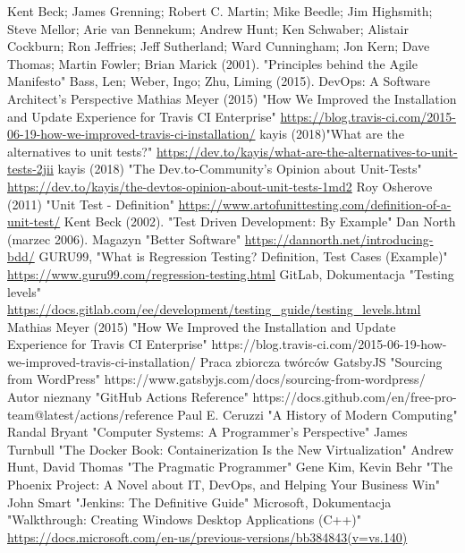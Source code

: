 \documentclass[twoside]{projektInzynierskiMS}
\begin{document}
\begin{thebibliography}{12}

 Kent Beck; James Grenning; Robert C. Martin; Mike Beedle; Jim Highsmith; Steve Mellor; Arie van Bennekum; Andrew Hunt; Ken Schwaber; Alistair Cockburn; Ron Jeffries; Jeff Sutherland; Ward Cunningham; Jon Kern; Dave Thomas; Martin Fowler; Brian Marick (2001). "Principles behind the Agile Manifesto"
 Bass, Len; Weber, Ingo; Zhu, Liming (2015). DevOps: A Software Architect's Perspective
 Mathias Meyer (2015)  "How We Improved the Installation and Update Experience for Travis CI Enterprise" \url{https://blog.travis-ci.com/2015-06-19-how-we-improved-travis-ci-installation/}
 kayis (2018)"What are the alternatives to unit tests?" \url{https://dev.to/kayis/what-are-the-alternatives-to-unit-tests-2jii}
 kayis (2018) "The Dev.to-Community's Opinion about Unit-Tests" \url{https://dev.to/kayis/the-devtos-opinion-about-unit-tests-1md2}
 Roy Osherove (2011) "Unit Test - Definition" \url{https://www.artofunittesting.com/definition-of-a-unit-test/}
 Kent Beck (2002). "Test Driven Development: By Example"
 Dan North (marzec 2006). Magazyn "Better Software" \url{https://dannorth.net/introducing-bdd/}
 GURU99, "What is Regression Testing? Definition, Test Cases (Example)" \url{https://www.guru99.com/regression-testing.html}
 GitLab, Dokumentacja "Testing levels" \url{https://docs.gitlab.com/ee/development/testing\_guide/testing\_levels.html}
 Mathias Meyer (2015)  "How We Improved the Installation and Update Experience for Travis CI Enterprise" https://blog.travis-ci.com/2015-06-19-how-we-improved-travis-ci-installation/
 Praca zbiorcza twórców GatsbyJS "Sourcing from WordPress" https://www.gatsbyjs.com/docs/sourcing-from-wordpress/
 Autor nieznany "GitHub Actions Reference" https://docs.github.com/en/free-pro-team@latest/actions/reference
 Paul E. Ceruzzi "A History of Modern Computing"
 Randal Bryant "Computer Systems: A Programmer's Perspective"
 James Turnbull "The Docker Book: Containerization Is the New Virtualization"
 Andrew Hunt, David Thomas "The Pragmatic Programmer"
 Gene Kim, Kevin Behr "The Phoenix Project: A Novel about IT, DevOps, and Helping Your Business Win"
 John Smart "Jenkins: The Definitive Guide"
 Microsoft, Dokumentacja "Walkthrough: Creating Windows Desktop Applications (C++)" \url{https://docs.microsoft.com/en-us/previous-versions/bb384843(v=vs.140)}

\end{thebibliography}
\end{document}
